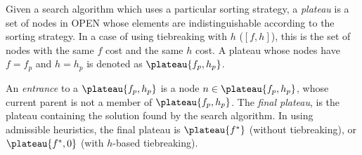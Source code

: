 Given a search algorithm which uses a particular sorting strategy, 
a \emph{plateau} is a set of nodes in OPEN whose elements are
indistinguishable according to the sorting strategy. In a case of \astar
using tiebreaking with $h$ ($[f,h]$), this is the set of nodes with the
same $f$ cost and the same $h$ cost.
A plateau whose nodes have $f=f_p$ and $h=h_p$ is denoted as $\plateau{f_p,h_p}$.

An \emph{entrance} to a $\plateau{f_p,h_p}$ is a node $n \in
\plateau{f_p,h_p}$, whose current parent is not a member of
$\plateau{f_p,h_p}$.  The \emph{final plateau}, is the plateau
containing the solution found by the search algorithm.  In \astar using
admissible heuristics, the final plateau is $\plateau{f^*}$ (without
tiebreaking), or $\plateau{f^*,0}$ (with $h$-based tiebreaking).
